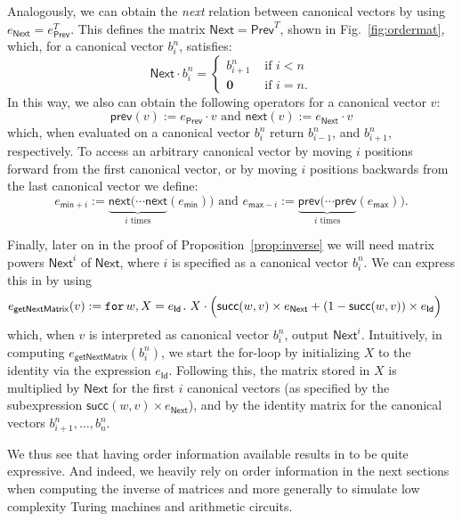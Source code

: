  
Analogously, we can obtain the \textit{next} relation between canonical vectors by using $e_{\mathsf{Next}} = e_{\mathsf{Prev}}^T$. This defines the matrix $\mathsf{Next}= \mathsf{Prev}^T$, shown in Fig.~\ref{fig:ordermat}, which, for a canonical vector $b_i^n$, satisfies:
\[
{\mathsf{Next}}\cdot b_i^n=\begin{cases}
               b_{i+1}^n & \text{ if } i < n \\
              \mathbf{0} & \text{ if } i = n.
            \end{cases}
\]
In this way, we also can obtain the following operators for a canonical vector $v$: 
$$\mathsf{prev}(v):=e_{\mathsf{Prev}}\cdot v \text{ and }
\mathsf{next}(v):=e_{\mathsf{Next}}\cdot v$$
which, when evaluated on a canonical vector $b_i^n$ return $b_{i-1}^n$, and $b_{i+1}^n$, respectively. 
To access an arbitrary canonical vector by moving $i$ positions forward from the first canonical vector, or by moving $i$ positions backwards from the last canonical vector we define:
\[
e_{\mathsf{min}+i}:=\underbrace{\mathsf{next}(\cdots \mathsf{next}}_{i\text{ times}}(e_{\mathsf{min}}))
\text{ and }
e_{\mathsf{max}-i}:=\underbrace{\mathsf{prev}(\cdots \mathsf{prev}}_{i\text{ times}}(e_{\mathsf{max}})).
\]

Finally, later on in the proof of Proposition~\ref{prop:inverse} we will need  matrix powers $\mathsf{Next}^i$ of $\mathsf{Next}$, where $i$ is specified as
a canonical vector $b_i^n$. We can express this in \langfor by using
\begin{align*}
e_{\mathsf{getNextMatrix}}(v)&:=\texttt{for}\, w,X = e_\mathsf{Id} \texttt{.}\,  X \cdot \Big( \mathsf{succ}(w,v)\times e_{\mathsf{Next}} + (1 - \mathsf{succ}(w,v))\times e_{\mathsf{Id}} \Big)
\end{align*}
which, when $v$ is interpreted as canonical vector $b_i^n$, output 
$\mathsf{Next}^i$. 
Intuitively, in computing  $e_{\mathsf{getNextMatrix}}(b_i^n)$, we start the for-loop by initializing $X$ to the identity via the expression $e_{\mathsf{Id}}$. Following this, the matrix stored in $X$ is multiplied by $\mathsf{Next}$ for the first $i$ canonical vectors (as specified by the subexpression $\mathsf{succ}(w,v)\times e_{\mathsf{Next}}$), and by the identity matrix for the canonical vectors $b_{i+1}^n, \ldots , b_n^n$. 


We thus see that having order information available results in \langfor to be quite expressive. And indeed,
we heavily rely on order information in the next sections when computing the inverse of matrices and more generally to simulate low complexity Turing machines and arithmetic circuits.


